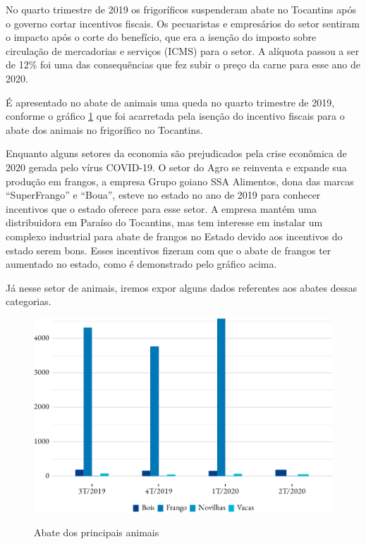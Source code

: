 
\par No quarto trimestre de 2019 os frigoríficos suspenderam abate no Tocantins após o governo cortar incentivos fiscais. Os pecuaristas e empresários do setor sentiram o impacto após o corte do benefício, que era a isenção do imposto sobre circulação de mercadorias e serviços (ICMS) para o setor. A alíquota passou a ser de 12\% foi uma das consequências que fez subir o preço da carne para esse ano de 2020.

\par É apresentado no abate de animais uma queda no quarto trimestre de 2019, conforme o gráfico \ref{fig:abate} que foi acarretada pela isenção do incentivo fiscais para o abate dos animais no frigorífico no Tocantins. 

\par Enquanto alguns setores da economia são prejudicados pela crise econômica de 2020 gerada pelo vírus COVID-19. O setor do Agro se reinventa e expande sua produção em frangos, a empresa Grupo goiano SSA Alimentos, dona das marcas “SuperFrango” e “Boua”, esteve no estado no ano de 2019 para conhecer incentivos que o estado oferece para esse setor. A empresa mantém uma distribuidora em Paraíso do Tocantins, mas tem interesse em instalar um complexo industrial para abate de frangos no Estado devido aos incentivos do estado serem bons. Esses incentivos fizeram com que o abate de frangos ter aumentado no estado, como é demonstrado pelo gráfico acima.


\par Já nesse setor de animais, iremos expor alguns dados referentes aos abates dessas categorias.

\begin{figure}[h]
	\caption{Abate dos principais animais}
	\includegraphics{fig/abates-1.pdf}
	\label{fig:abate}
\end{figure}
